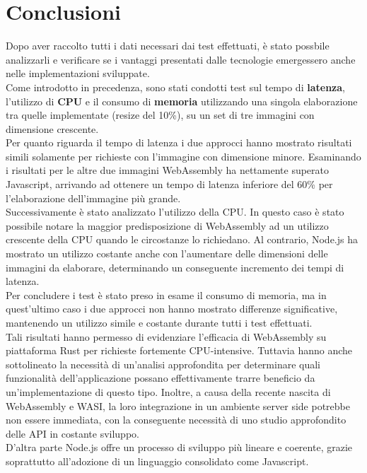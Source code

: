 \chapter*{Conclusioni}
\label{Conclusioni}
Dopo aver raccolto tutti i dati necessari dai test effettuati, è stato possbile analizzarli e verificare se i vantaggi presentati dalle tecnologie emergessero anche nelle implementazioni sviluppate.
\\Come introdotto in precedenza, sono stati condotti test sul tempo di \textbf{latenza}, l'utilizzo di \textbf{CPU} e il consumo di \textbf{memoria} utilizzando una singola elaborazione tra quelle implementate (resize del 10\%), su un set di tre immagini con dimensione crescente.
\\Per quanto riguarda il tempo di latenza i due approcci hanno mostrato risultati simili solamente per richieste con l'immagine con dimensione minore. Esaminando i risultati per le altre due immagini WebAssembly ha nettamente superato Javascript, arrivando ad ottenere un tempo di latenza inferiore del 60\% per l'elaborazione dell'immagine più grande.
\\Successivamente è stato analizzato l'utilizzo della CPU. In questo caso è stato possibile notare la maggior predisposizione di WebAssembly ad un utilizzo crescente della CPU quando le circostanze lo richiedano.
Al contrario, Node.js ha mostrato un utilizzo costante anche con l'aumentare delle dimensioni delle immagini da elaborare, determinando un conseguente incremento dei tempi di latenza.
\\Per concludere i test è stato preso in esame il consumo di memoria, ma in quest'ultimo caso i due approcci non hanno mostrato differenze significative, mantenendo un utilizzo simile e costante durante tutti i test effettuati.
\\Tali risultati hanno permesso di evidenziare l'efficacia di WebAssembly su piattaforma Rust per richieste fortemente CPU-intensive.
Tuttavia hanno anche sottolineato la necessità di un'analisi approfondita per determinare quali funzionalità dell’applicazione possano effettivamente trarre beneficio da un’implementazione di questo tipo.
Inoltre, a causa della recente nascita di WebAssembly e WASI, la loro integrazione in un ambiente server side potrebbe non essere immediata, con la conseguente necessità di uno studio approfondito delle API in costante sviluppo.
\\D'altra parte Node.js offre un processo di sviluppo più lineare e coerente, grazie soprattutto all'adozione di un linguaggio consolidato come Javascript.
